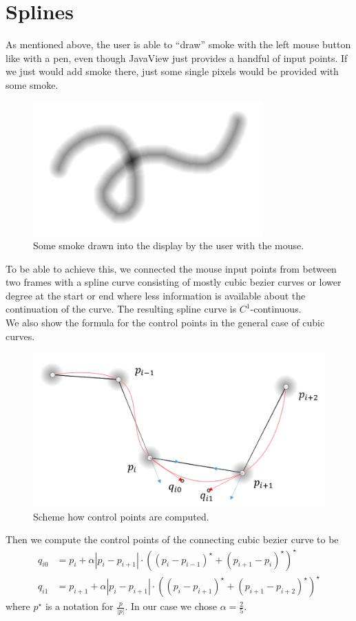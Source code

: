 \documentclass[a4paper,10pt,oneside,final,german,openbib,pdftex,titlepage]{scrbook}
\begin{document}
\section{Splines}\label{splinesChapter}
As mentioned above, the user is able to ``draw'' smoke with the left mouse button like with a pen, even though JavaView just provides a handful of input points. If we just would add smoke there, just some single pixels would be provided with some smoke.\\

\begin{figure}[H]
 \centering
 \includegraphics[scale=0.8]{images/SmokeTrace.png}
 \caption{Some smoke drawn into the display by the user with the mouse.}
 \label{SmokeTrace}
\end{figure}
To be able to achieve this, we connected the mouse input points from between two frames with a spline curve consisting of mostly cubic bezier curves or lower degree at the start or end where less information is available about the continuation of the curve. The resulting spline curve is $C^1$-continuous.\\

We also show the formula for the control points in the general case of cubic curves.
\begin{figure}[H]
 \centering
 \includegraphics[scale=0.3]{images/SplinesScheme.png}
 \caption{Scheme how control points are computed.}
 \label{SplinesScheme}
\end{figure}
Then we compute the control points of the connecting cubic bezier curve to be
\begin{align*}
q_{i0} & = p_i + \alpha |p_i-p_{i+1}| \cdot \left((p_i-p_{i-1})^{\star} + (p_{i+1}-p_i)^{\star}\right)^{\star} \\
q_{i1} & = p_{i+1} + \alpha |p_i-p_{i+1}| \cdot \left((p_i-p_{i+1})^{\star} + (p_{i+1}-p_{i+2})^{\star}\right)^{\star}
\end{align*}
where $p^{\star}$ is a notation for $\frac{p}{|p|}$. In our case we chose $\alpha = \frac{2}{5}$. 
\end{document}

